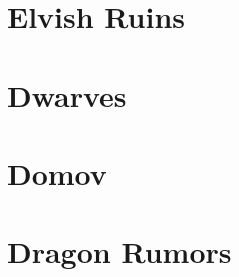 

\begin{multicols}{2}

\section{Elvish Ruins}


\section{Dwarves}


\section{Domov}


\section{Dragon Rumors}


\end{multicols}
